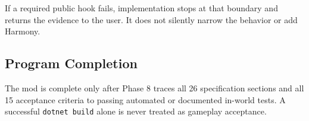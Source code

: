 \documentclass[
  9pt,
  letterpaper,
]{extarticle}
\newcommand{\passthrough}[1]{#1}
\begin{document}
If a required public hook fails, implementation stops at that boundary
and returns the evidence to the user. It does not silently narrow the
behavior or add Harmony.

\subsection{Program Completion}\label{program-completion}

The mod is complete only after Phase 8 traces all 26 specification
sections and all 15 acceptance criteria to passing automated or
documented in-world tests. A successful
\passthrough{\lstinline!dotnet build!} alone is never treated as
gameplay acceptance.
\end{document}
